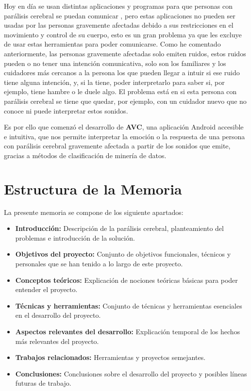 Hoy en día se usan distintas aplicaciones y programas para que personas con parálisis cerebral se puedan comunicar \cite{jocomunico}, pero estas aplicaciones no pueden ser usadas por las personas gravemente afectadas debido a sus restricciones en el movimiento y control de su cuerpo, esto es un gran problema ya que les excluye de usar estas herramientas para poder comunicarse. Como he comentado anteriormente, las personas gravemente afectadas solo emiten ruidos, estos ruidos pueden o no tener una intención comunicativa, solo son los familiares y los cuidadores más cercanos a la persona los que pueden llegar a intuir si ese ruido tiene alguna intención, y, si la tiene, poder interpretarlo para saber si, por ejemplo, tiene hambre o le duele algo. El problema está en si esta persona con parálisis cerebral se tiene que quedar, por ejemplo, con un cuidador nuevo que no conoce ni puede interpretar estos sonidos.

Es por ello que comenzó el desarrollo de \textbf{AVC}, una aplicación Android accesible e intuitiva, que nos permite interpretar la emoción o la respuesta de una persona con parálisis cerebral gravemente afectada a partir de los sonidos que emite, gracias a métodos de clasificación de minería de datos.

\section{Estructura de la Memoria}
La presente memoria se compone de los siguiente apartados: 
\begin{itemize}
	\item 
		\textbf{Introducción:} Descripción de la parálisis cerebral, planteamiento del problemas e introducción de la solución.
	\item
		\textbf{Objetivos del proyecto:} Conjunto de objetivos funcionales, técnicos y personales que se han tenido a lo largo de este proyecto.
	\item
		\textbf{Conceptos teóricos:} Explicación de nociones teóricas básicas para poder entender el proyecto.
	\item
		\textbf{Técnicas y herramientas:} Conjunto de técnicas y herramientas esenciales en el desarrollo del proyecto.
	\item
		\textbf{Aspectos relevantes del desarrollo:} Explicación temporal de los hechos más relevantes del proyecto.
	\item
		\textbf{Trabajos relacionados:} Herramientas y proyectos semejantes.
	\item
		\textbf{Conclusiones:} Conclusiones sobre el desarrollo del proyecto y posibles líneas futuras de trabajo.
\end{itemize}

